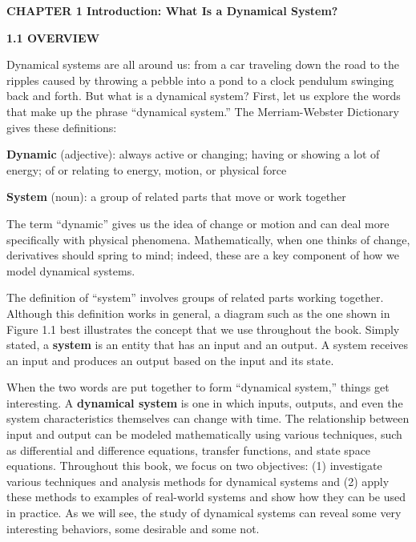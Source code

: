 \documentclass[12pt]{article}
\begin{document}
\textbf{CHAPTER 1
Introduction: What Is a
Dynamical System?}

\hfill

\textbf{1.1 OVERVIEW}

\hfill

Dynamical systems are all around us: from a car traveling down the road to
the ripples caused by throwing a pebble into a pond to a clock pendulum
swinging back and forth. But what is a dynamical system? First, let us
explore the words that make up the phrase “dynamical system.” The
Merriam-Webster Dictionary gives these definitions:

\hfill

\textbf{Dynamic} (adjective): always active or changing; having or showing a lot of
energy; of or relating to energy, motion, or physical force

\hfill

\textbf{System} (noun): a group of related parts that move or work together

\hfill

The term “dynamic” gives us the idea of change or motion and can deal
more specifically with physical phenomena. Mathematically, when one
thinks of change, derivatives should spring to mind; indeed, these are a key
component of how we model dynamical systems.

The definition of “system” involves groups of related parts working
together. Although this definition works in general, a diagram such as the
one shown in Figure 1.1 best illustrates the concept that we use throughout
the book. Simply stated, a \textbf{system} is an entity that has an input and an
output. A system receives an input and produces an output based on the
input and its state.

When the two words are put together to form “dynamical system,”
things get interesting. A \textbf{dynamical system} is one in which inputs, outputs,
and even the system characteristics themselves can change with time.
The relationship between input and output can be modeled mathematically
using various techniques, such as differential and difference equations, transfer functions, and state space equations. Throughout this book, we
focus on two objectives: (1) investigate various techniques and analysis
methods for dynamical systems and (2) apply these methods to examples of
real-world systems and show how they can be used in practice. As we will
see, the study of dynamical systems can reveal some very interesting
behaviors, some desirable and some not.
\end{document}
